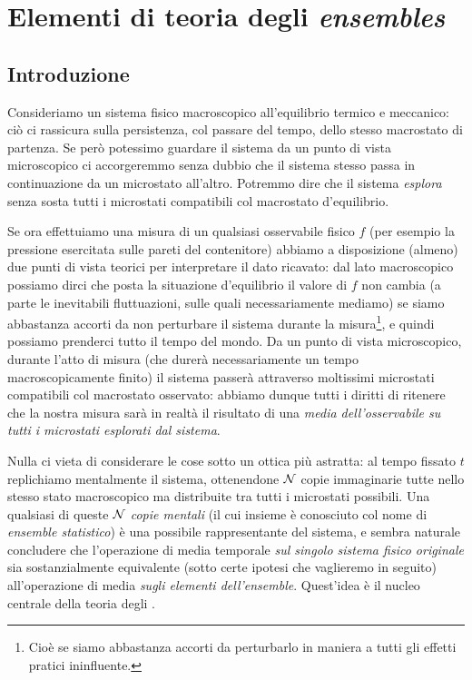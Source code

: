\chapter{Elementi di teoria degli {\em ensembles}}
\label{cap:elementi}

\section{Introduzione}
\label{sec:03-intro}

Consideriamo un sistema fisico macroscopico all'equilibrio termico e meccanico: ciò ci rassicura sulla persistenza, col passare del tempo, dello stesso macrostato di partenza. Se però potessimo guardare il sistema da un punto di vista microscopico ci accorgeremmo senza dubbio che il sistema stesso passa in continuazione da un microstato all'altro. Potremmo dire che il sistema {\em esplora} senza sosta tutti i microstati compatibili col macrostato d'equilibrio.

Se ora effettuiamo una misura di un qualsiasi osservabile fisico $f$ (per esempio la pressione esercitata sulle pareti del contenitore) abbiamo a disposizione (almeno) due punti di vista teorici per interpretare il dato ricavato: dal lato macroscopico possiamo dirci che posta la situazione d'equilibrio il valore di $f$ non cambia (a parte le inevitabili fluttuazioni, sulle quali necessariamente mediamo) se siamo abbastanza accorti da non perturbare il sistema durante la misura\footnote{Cioè se siamo abbastanza accorti da perturbarlo in maniera a tutti gli effetti pratici ininfluente.}, e quindi possiamo prenderci tutto il tempo del mondo. Da un punto di vista microscopico, durante l'atto di misura (che durerà necessariamente un tempo macroscopicamente finito) il sistema passerà attraverso moltissimi microstati compatibili col macrostato osservato: abbiamo dunque tutti i diritti di ritenere che la nostra misura sarà in realtà il risultato di una {\em media dell'osservabile su tutti i microstati esplorati dal sistema}.

Nulla ci vieta di considerare le cose sotto un ottica più astratta: al tempo fissato $t$ replichiamo mentalmente il sistema, ottenendone ${\mathcal N}$ copie immaginarie tutte nello stesso stato macroscopico ma distribuite tra tutti i microstati possibili. Una qualsiasi di queste ${\mathcal N}$ {\em copie mentali} (il cui insieme è conosciuto col nome di {\em ensemble statistico}) è una possibile rappresentante del sistema, e sembra naturale concludere che l'operazione di media temporale {\em sul singolo sistema fisico originale} sia sostanzialmente equivalente (sotto certe ipotesi che vaglieremo in seguito) all'operazione di media {\em sugli elementi dell'ensemble}. Quest'idea è il nucleo centrale della teoria degli \ensembles.

